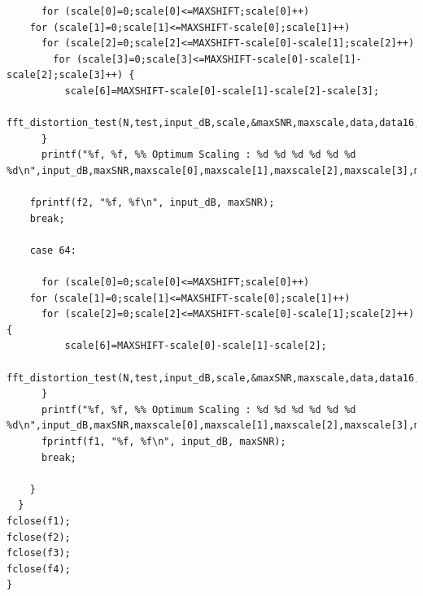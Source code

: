 \documentclass{article}
\begin{document}
\begin{lstlisting}
      for (scale[0]=0;scale[0]<=MAXSHIFT;scale[0]++)
	for (scale[1]=0;scale[1]<=MAXSHIFT-scale[0];scale[1]++)
	  for (scale[2]=0;scale[2]<=MAXSHIFT-scale[0]-scale[1];scale[2]++)
	    for (scale[3]=0;scale[3]<=MAXSHIFT-scale[0]-scale[1]-scale[2];scale[3]++) {
	      scale[6]=MAXSHIFT-scale[0]-scale[1]-scale[2]-scale[3];
	      fft_distortion_test(N,test,input_dB,scale,&maxSNR,maxscale,data,data16,data32);
	  }
      printf("%f, %f, %% Optimum Scaling : %d %d %d %d %d %d %d\n",input_dB,maxSNR,maxscale[0],maxscale[1],maxscale[2],maxscale[3],maxscale[4],maxscale[5],maxscale[6]);
      
	fprintf(f2, "%f, %f\n", input_dB, maxSNR);
	break;

    case 64:

      for (scale[0]=0;scale[0]<=MAXSHIFT;scale[0]++)
	for (scale[1]=0;scale[1]<=MAXSHIFT-scale[0];scale[1]++)
	  for (scale[2]=0;scale[2]<=MAXSHIFT-scale[0]-scale[1];scale[2]++) {
	      scale[6]=MAXSHIFT-scale[0]-scale[1]-scale[2];
	      fft_distortion_test(N,test,input_dB,scale,&maxSNR,maxscale,data,data16,data32);
	  }
      printf("%f, %f, %% Optimum Scaling : %d %d %d %d %d %d %d\n",input_dB,maxSNR,maxscale[0],maxscale[1],maxscale[2],maxscale[3],maxscale[4],maxscale[5],maxscale[6]);
	  fprintf(f1, "%f, %f\n", input_dB, maxSNR);
      break;

    }
  }
fclose(f1);
fclose(f2);
fclose(f3);
fclose(f4);
}

\end{lstlisting}
\end{document}
